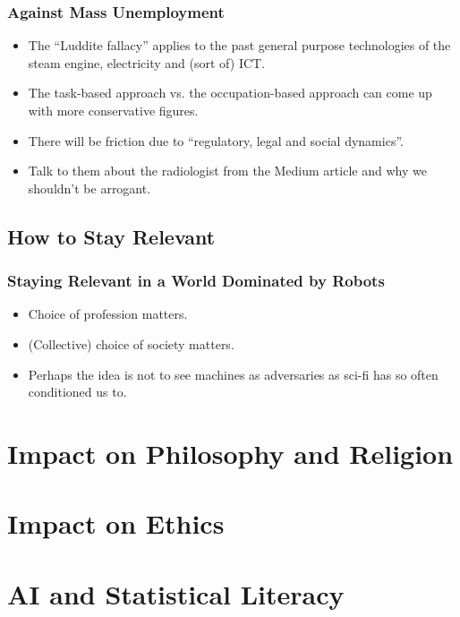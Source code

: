 \documentclass[10pt]{beamer}
\begin{document}
  \begin{frame}
    \frametitle{Against Mass Unemployment}

    \begin{itemize}
      \item The ``Luddite fallacy'' applies to the past general purpose
        technologies of the steam engine, electricity and (sort of) ICT.
      \pause
      \item The task-based approach vs. the occupation-based approach can come
        up with more conservative figures.
      \pause
      \item There will be friction due to ``regulatory, legal and social
        dynamics''.
      \pause
      \item Talk to them about the radiologist from the Medium article and why
        we shouldn't be arrogant.
    \end{itemize}
  \end{frame}

  \subsection{How to Stay Relevant}

  \begin{frame}
    \frametitle{Staying Relevant in a World Dominated by Robots}

    \begin{itemize}
      \item Choice of profession matters.
      \pause
      \item (Collective) choice of society matters.
      \pause
      \item Perhaps the idea is not to see machines as adversaries as sci-fi
        has so often conditioned us to.
    \end{itemize}
  \end{frame}


  \section{Impact on Philosophy and Religion}
  \section{Impact on Ethics}
  \section{AI and Statistical Literacy}
\end{document}
